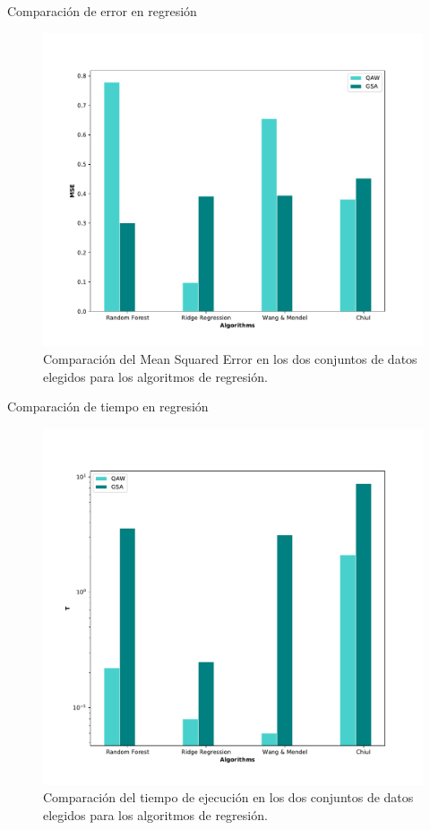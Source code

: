 \documentclass[10pt, spanish]{beamer}
\begin{document}
\begin{frame}{Comparación de error en regresión}
    \begin{figure}
	\centering
	\includegraphics[width=.75\textwidth]{img/mse-reg}
	\caption{\footnotesize Comparación del Mean Squared Error en los dos conjuntos de datos elegidos para los algoritmos de regresión.}
\end{figure}
\end{frame}

\begin{frame}{Comparación de tiempo en regresión}
  \begin{figure}
	\centering
	\includegraphics[width=.65\textwidth]{img/time-reg}
	\caption{\footnotesize Comparación del tiempo de ejecución en los dos conjuntos de datos elegidos para los algoritmos de regresión.}
\end{figure}
\end{frame}
\end{document}
